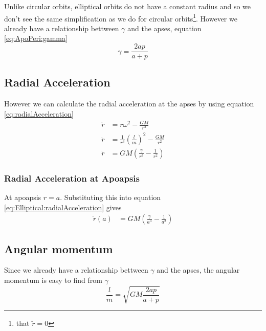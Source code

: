 Unlike circular orbits, elliptical orbits do not have a constant radius and so we don't see the same simplification as we do for circular orbits\footnote{that $\ddot{r}=0$}. However we already have a relationship bettween $\gamma$ and the apses, equation \ref{eq:ApoPeri:gamma}
\begin{equation}
\gamma=\frac{2ap}{a+p}
\end{equation}

\subsection{Radial Acceleration}
However we can calculate the radial acceleration at the apses by using equation \ref{eq:radialAcceleration}
\begin{align}
\ddot{r}&=r\omega^2-\frac{GM}{r^2}\nonumber \\
\ddot{r}&=\frac{1}{r^3}\left(\frac{l}{m}\right)^2-\frac{GM}{r^2} \nonumber \\
\ddot{r}&=GM\left(\frac{\gamma}{r^3}-\frac{1}{r^2}\right)\label{eq:Elliptical:radialAcceleration}
\end{align}

\subsubsection{Radial Acceleration at Apoapsis}
At apoapsis $r=a$. Substituting this into equation \ref{eq:Elliptical:radialAcceleration} gives
\begin{align}
\ddot{r}(a)&=GM\left(\frac{\gamma}{a^3}-\frac{1}{a^2}\right)
\end{align}

\subsection{Angular momentum}
Since we already have a relationship bettween $\gamma$ and the apses, the angular momentum is easy to find from $\gamma$
\begin{equation}
\frac{l}{m}=\sqrt{GM\frac{2ap}{a+p}}
\end{equation}
